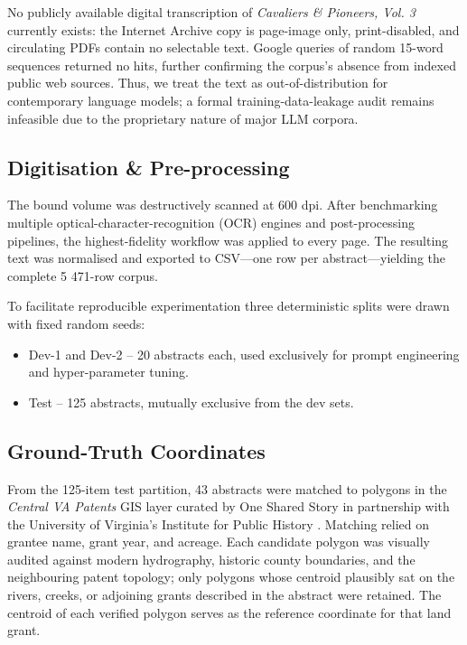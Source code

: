 No publicly available digital transcription of \emph{Cavaliers \&
Pioneers, Vol. 3} currently exists: the Internet Archive copy is
page-image only, print-disabled, and circulating PDFs contain no
selectable text. Google queries of random 15-word sequences returned no
hits, further confirming the corpus's absence from indexed public web
sources. Thus, we treat the text as out-of-distribution for contemporary
language models; a formal training-data-leakage audit remains infeasible
due to the proprietary nature of major LLM corpora.

\subsection{Digitisation \&
Pre-processing}\label{digitisation-pre-processing}

The bound volume was destructively scanned at 600 dpi. After
benchmarking multiple optical-character-recognition (OCR) engines and
post-processing pipelines, the highest-fidelity workflow was applied to
every page. The resulting text was normalised and exported to CSV---one
row per abstract---yielding the complete 5 471-row corpus.

To facilitate reproducible experimentation three deterministic splits
were drawn with fixed random seeds:

\begin{itemize}
\tightlist
\item
  Dev-1 and Dev-2 -- 20 abstracts each, used exclusively for prompt
  engineering and hyper-parameter tuning.
\item
  Test -- 125 abstracts, mutually exclusive from the dev sets.
\end{itemize}

\subsection{Ground-Truth
Coordinates}\label{ground-truth-coordinates}

From the 125-item test partition, 43 abstracts were matched to polygons
in the \emph{Central VA Patents} GIS layer curated by One Shared Story
in partnership with the University of Virginia's Institute for Public
History \citep{central_va_patents_gis}. Matching relied on grantee name,
grant year, and acreage. Each candidate polygon was visually audited
against modern hydrography, historic county boundaries, and the
neighbouring patent topology; only polygons whose centroid plausibly sat
on the rivers, creeks, or adjoining grants described in the abstract
were retained. The centroid of each verified polygon serves as the
reference coordinate for that land grant.

